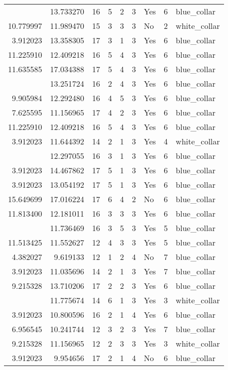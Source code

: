 \documentclass[
]{article}
\begin{document}
\begin{longtable}[t]{rrrrrllrl}
\addlinespace
10.820778 & 13.733270 & 16 & 5 & 2 & 3 & Yes & 6 & blue\_collar\\
10.779997 & 11.989470 & 15 & 3 & 3 & 3 & No & 2 & white\_collar\\
3.912023 & 13.358305 & 17 & 3 & 1 & 3 & Yes & 6 & blue\_collar\\
11.225910 & 12.409218 & 16 & 5 & 4 & 3 & Yes & 6 & blue\_collar\\
11.635585 & 17.034388 & 17 & 5 & 4 & 3 & Yes & 6 & blue\_collar\\
\addlinespace
11.918724 & 13.251724 & 16 & 2 & 4 & 3 & Yes & 6 & blue\_collar\\
9.905984 & 12.292480 & 16 & 4 & 5 & 3 & Yes & 6 & blue\_collar\\
7.625595 & 11.156965 & 17 & 4 & 2 & 3 & Yes & 6 & blue\_collar\\
11.225910 & 12.409218 & 16 & 5 & 4 & 3 & Yes & 6 & blue\_collar\\
3.912023 & 11.644392 & 14 & 2 & 1 & 3 & Yes & 4 & white\_collar\\
\addlinespace
3.912023 & 12.297055 & 16 & 3 & 1 & 3 & Yes & 6 & blue\_collar\\
3.912023 & 14.467862 & 17 & 5 & 1 & 3 & Yes & 6 & blue\_collar\\
3.912023 & 13.054192 & 17 & 5 & 1 & 3 & Yes & 6 & blue\_collar\\
15.649699 & 17.016224 & 17 & 6 & 4 & 2 & No & 6 & blue\_collar\\
11.813400 & 12.181011 & 16 & 3 & 3 & 3 & Yes & 6 & blue\_collar\\
\addlinespace
8.022897 & 11.736469 & 16 & 3 & 5 & 3 & Yes & 5 & blue\_collar\\
11.513425 & 11.552627 & 12 & 4 & 3 & 3 & Yes & 5 & blue\_collar\\
4.382027 & 9.619133 & 12 & 1 & 2 & 4 & No & 7 & blue\_collar\\
3.912023 & 11.035696 & 14 & 2 & 1 & 3 & Yes & 7 & blue\_collar\\
9.215328 & 13.710206 & 17 & 2 & 2 & 3 & Yes & 6 & blue\_collar\\
\addlinespace
3.912023 & 11.775674 & 14 & 6 & 1 & 3 & Yes & 3 & white\_collar\\
3.912023 & 10.800596 & 16 & 2 & 1 & 4 & Yes & 6 & blue\_collar\\
6.956545 & 10.241744 & 12 & 3 & 2 & 3 & Yes & 7 & blue\_collar\\
9.215328 & 11.156965 & 12 & 2 & 3 & 3 & Yes & 3 & white\_collar\\
3.912023 & 9.954656 & 17 & 2 & 1 & 4 & No & 6 & blue\_collar\\

\end{longtable}
\end{document}
